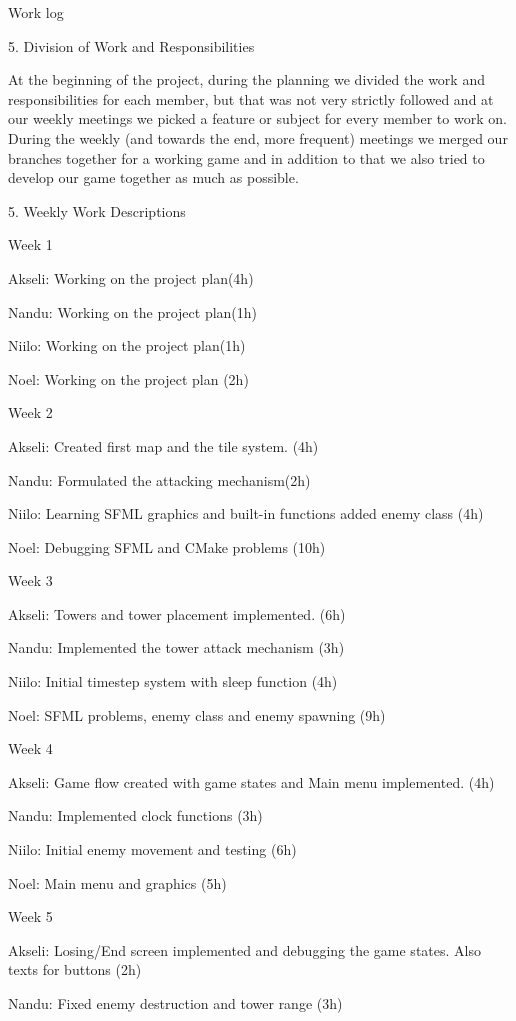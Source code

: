 Work log

5. Division of Work and Responsibilities

At the beginning of the project, during the planning we divided the work and responsibilities for each member, but that was not very strictly followed and at our weekly meetings we picked a feature or subject for every member to work on. During the weekly (and towards the end, more frequent) meetings we merged our branches together for a working game and in addition to that we also tried to develop our game together as much as possible.

5. Weekly Work Descriptions

Week 1

Akseli\+: Working on the project plan(4h)

Nandu\+: Working on the project plan(1h)

Niilo\+: Working on the project plan(1h)

Noel\+: Working on the project plan (2h)

Week 2

Akseli\+: Created first map and the tile system. (4h)

Nandu\+: Formulated the attacking mechanism(2h)

Niilo\+: Learning SFML graphics and built-\/in functions added enemy class (4h)

Noel\+: Debugging SFML and CMake problems (10h)

Week 3

Akseli\+: Towers and tower placement implemented. (6h)

Nandu\+: Implemented the tower attack mechanism (3h)

Niilo\+: Initial timestep system with sleep function (4h)

Noel\+: SFML problems, enemy class and enemy spawning (9h)

Week 4

Akseli\+: Game flow created with game states and Main menu implemented. (4h)

Nandu\+: Implemented clock functions (3h)

Niilo\+: Initial enemy movement and testing (6h)

Noel\+: Main menu and graphics (5h)

Week 5

Akseli\+: Losing/\+End screen implemented and debugging the game states. Also texts for buttons (2h)

Nandu\+: Fixed enemy destruction and tower range (3h)

